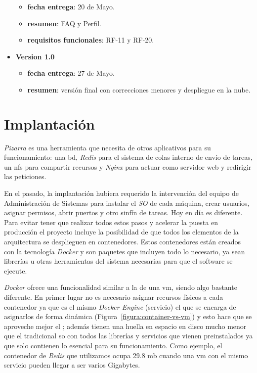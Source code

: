\documentclass[11pt,spanish,listoffigures,listoftables]{tfgetsinf}
\begin{document}
\begin{itemize}
\begin{itemize}
	\item \textbf{fecha entrega}: 20 de Mayo.
	\item \textbf{resumen}: FAQ y Perfil. 
	\item \textbf{requisitos funcionales}: RF-11 y RF-20.
\end{itemize}
	\item \textbf{Version 1.0}
\begin{itemize}
	\item \textbf{fecha entrega}: 27 de Mayo.
	\item \textbf{resumen}: versión final con correcciones menores y despliegue en la nube.
\end{itemize}	
\end{itemize}

\chapter{Implantación}

\textit{Pizarra} es una herramienta que necesita de otros aplicativos para su funcionamiento: una \acrfull{bd}, \textit{Redis} para el sistema de \gls{cola}s interno de envío de \gls{tarea}s, un \acrshort{nfs} para compartir recursos y \textit{Nginx} para actuar como servidor web y redirigir las peticiones. 

En el pasado, la implantación hubiera requerido la intervención del equipo de Administración de Sistemas para instalar el \textit{SO} de cada máquina, crear usuarios, asignar permisos, abrir puertos y otro sinfín de tareas. Hoy en día es diferente.
Para evitar tener que realizar todos estos pasos y acelerar la puesta en producción el proyecto incluye la posibilidad de que todos los elementos de la arquitectura se desplieguen en \Gls{contenedor}es. Estos \Gls{contenedor}es están creados con la tecnología \textit{Docker} y son paquetes que incluyen todo lo necesario, ya sean librerías u otras herramientas del sistema necesarias para que el software se ejecute.

\textit{Docker} ofrece una funcionalidad similar a la de una \acrfull{vm}, siendo algo bastante diferente. En primer lugar no es necesario asignar recursos físicos a cada \gls{contenedor} ya que es el mismo \textit{Docker Engine} (servicio) el que se encarga de asignarlos de forma dinámica (Figura~\ref{figura:container-vs-vm}) y esto hace que se aproveche mejor el ; además tienen una huella en espacio en disco mucho menor que el tradicional \acrshort{so} con todos las librerías y servicios que vienen preinstalados ya que solo contienen lo esencial para su funcionamiento. Como ejemplo, el \gls{contenedor} de \textit{Redis} que utilizamos ocupa 29.8 \acrshort{mb} cuando una \acrshort{vm} con el mismo servicio pueden llegar a ser varios Gigabytes.
\end{document}
